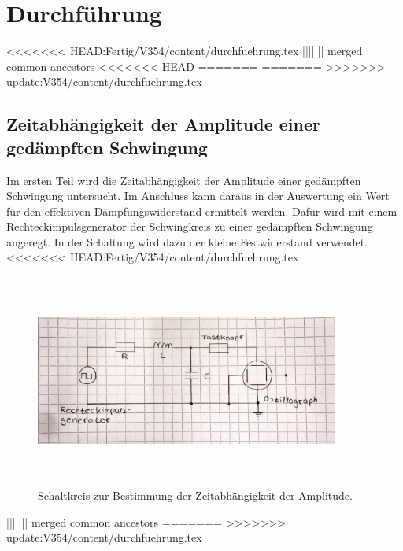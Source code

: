 \section{Durchführung}
<<<<<<< HEAD:Fertig/V354/content/durchfuehrung.tex
\label{sec:Durchfuehrung}
||||||| merged common ancestors
<<<<<<< HEAD
\label{sec:Durchführung}
=======
\label{sec:durchfuehrung}
=======
\label{sec:durchfuehrung}
>>>>>>> update:V354/content/durchfuehrung.tex

\subsection{Zeitabhängigkeit der Amplitude einer gedämpften Schwingung}
Im ersten Teil wird die Zeitabhängigkeit der Amplitude einer gedämpften Schwingung untersucht. Im Anschluss kann 
daraus in der Auswertung ein Wert für den effektiven Dämpfungswiderstand ermittelt werden. 
Dafür wird mit einem Rechteckimpulsgenerator der Schwingkreis zu einer gedämpften Schwingung angeregt.
In der Schaltung wird dazu der kleine Festwiderstand verwendet.
<<<<<<< HEAD:Fertig/V354/content/durchfuehrung.tex
\begin{figure}
    \centering
    \includegraphics[width= 10cm, height= 7cm]{build/a.jpg}
    \caption{Schaltkreis zur Bestimmung der Zeitabhängigkeit der Amplitude.}
    \label{fig:a}
\end{figure}
||||||| merged common ancestors
=======
>>>>>>> update:V354/content/durchfuehrung.tex

